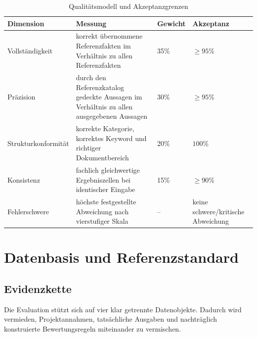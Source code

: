\documentclass[
  10pt,
  ngerman,
  a4paper,
  toc=graduated,
  numbers=noenddot,
  headings=standardclasses
]{scrartcl}
\begin{document}
\begin{table}[H]
\centering
\small
\begin{tabularx}{\textwidth}{L{2.8cm}Y C{1.6cm}L{2.5cm}}
\toprule
{}
\textbf{Dimension} & \textbf{Messung} & \textbf{Gewicht} & \textbf{Akzeptanz}\\
\midrule
Vollständigkeit & korrekt übernommene Referenzfakten im Verhältnis zu allen Referenzfakten & 35\% & $\geq 95\%$\\
Präzision & durch den Referenzkatalog gedeckte Aussagen im Verhältnis zu allen ausgegebenen Aussagen & 30\% & $\geq 95\%$\\
Strukturkonformität & korrekte Kategorie, korrektes Keyword und richtiger Dokumentbereich & 20\% & $100\%$\\
Konsistenz & fachlich gleichwertige Ergebniszellen bei identischer Eingabe & 15\% & $\geq 90\%$\\
Fehlerschwere & höchste festgestellte Abweichung nach vierstufiger Skala & -- & keine schwere/kritische Abweichung\\
\bottomrule
\end{tabularx}
\caption{Qualitätsmodell und Akzeptanzgrenzen}
\label{tab:qualitaetsmodell}
\end{table}

\newpage
\section{Datenbasis und Referenzstandard}

\subsection{Evidenzkette}

Die Evaluation stützt sich auf vier klar getrennte Datenobjekte. Dadurch wird vermieden, Projektannahmen, tatsächliche Ausgaben und nachträglich konstruierte Bewertungsregeln miteinander zu vermischen.
\end{document}
